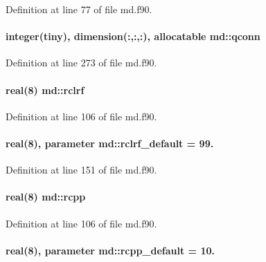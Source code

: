 Definition at line 77 of file md.\-f90.

\hypertarget{classmd_a9826652aaba721f80ac804293e7634d0}{
\paragraph[{qconn}]{\setlength{\rightskip}{0pt plus 5cm}integer(tiny), dimension(\-:,\-:,\-:), allocatable md\-::qconn}}\label{classmd_a9826652aaba721f80ac804293e7634d0}


Definition at line 273 of file md.\-f90.

\hypertarget{classmd_a8713057e602313e4dd972ac22bbdbd97}{
\paragraph[{rclrf}]{\setlength{\rightskip}{0pt plus 5cm}real(8) md\-::rclrf}}\label{classmd_a8713057e602313e4dd972ac22bbdbd97}


Definition at line 106 of file md.\-f90.

\hypertarget{classmd_a45dc4987c51010b053ea23a1cdc62894}{
\paragraph[{rclrf\-\_\-default}]{\setlength{\rightskip}{0pt plus 5cm}real(8), parameter md\-::rclrf\-\_\-default = 99.}}\label{classmd_a45dc4987c51010b053ea23a1cdc62894}


Definition at line 151 of file md.\-f90.

\hypertarget{classmd_a24b5c26f2e0de9fdcad07aa77819b516}{
\paragraph[{rcpp}]{\setlength{\rightskip}{0pt plus 5cm}real(8) md\-::rcpp}}\label{classmd_a24b5c26f2e0de9fdcad07aa77819b516}


Definition at line 106 of file md.\-f90.

\hypertarget{classmd_afdf8c43cdabafd853a977f75f528cbe4}{
\paragraph[{rcpp\-\_\-default}]{\setlength{\rightskip}{0pt plus 5cm}real(8), parameter md\-::rcpp\-\_\-default = 10.}}\label{classmd_afdf8c43cdabafd853a977f75f528cbe4}


